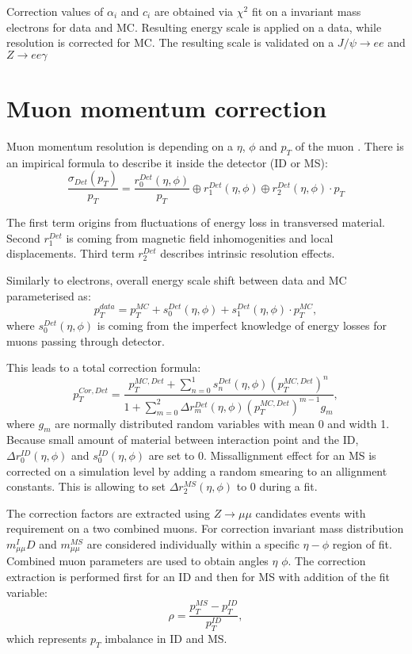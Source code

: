 Correction values of $\alpha_i$ and $c_i$ are obtained via $\chi^2$ fit on a invariant mass electrons for data and MC. Resulting energy scale is applied on a data, while resolution is corrected for MC. The resulting scale is validated on a $J/\psi \to ee$ and $Z\to ee \gamma$

\section{Muon momentum correction}
Muon momentum resolution is depending on a $\eta$, $\phi$ and $p_T$ of the muon \cite{AtlasExperiment}. There is an impirical formula to describe it inside the detector (ID or MS):
\begin{equation}\label{eq:MuonResolution}
\frac{\sigma_{Det}(p_T)}{p_T}=\frac{r^{Det}_0(\eta, \phi)}{p_T} \oplus r^{Det}_1 (\eta, \phi)  \oplus r^{Det}_2(\eta, \phi) \cdot p_T
\end{equation}

The first term origins from fluctuations of energy loss in transversed material. Second $r^{Det}_1$ is coming from magnetic field inhomogenities and local displacements. Third term $r^{Det}_2$ describes intrinsic resolution effects. 

Similarly to electrons, overall energy scale shift between data and MC parameterised as:
\begin{equation}
p_T^{data}=p_T^{MC}+s_0^{Det}(\eta, \phi)+s_1^{Det}(\eta, \phi) \cdot p_T^{MC},
\end{equation}
where $s_0^{Det}(\eta, \phi)$ is coming from the imperfect knowledge of energy losses for muons passing through detector. 

This leads to a total correction formula:
\begin{equation}
p^{Cor,Det}_T=\frac{p_{T}^{MC,Det}+\sum\limits_{n=0}^1 s_n^{Det}(\eta, \phi)(p_T^{MC,Det})^n}{1+\sum\limits_{m=0}^2 \Delta r_m^{Det}(\eta, \phi)(p_T^{MC,Det})^{m-1} g_m},
\end{equation}
where $g_m$ are normally distributed random variables with mean 0 and width 1. Because small amount of material between interaction point and the ID, $\Delta r^{ID}_0(\eta, \phi)$ and $s_0^{ID}(\eta, \phi)$ are set to 0. Missallignment effect for an MS is corrected on a simulation level by adding a random smearing to an allignment constants. This is allowing to set $\Delta r^{MS}_2(\eta, \phi)$ to 0 during a fit. 

The correction factors are extracted using $Z \to \mu \mu$ candidates events with requirement on a two combined muons. For correction invariant mass distribution $m_{\mu\mu}^ID$ and $m_{\mu\mu}^{MS}$ are considered individually within a specific $\eta - \phi$ region of fit. Combined muon parameters are used to obtain angles $\eta$ $\phi$. 
The correction extraction is performed first for an ID and then for MS with addition of the fit variable:
\begin{equation}
\rho = \frac{p_T^{MS}-p_T^{ID}}{p_T^{ID}},
\end{equation}
which represents $p_T$ imbalance in ID and MS. 

